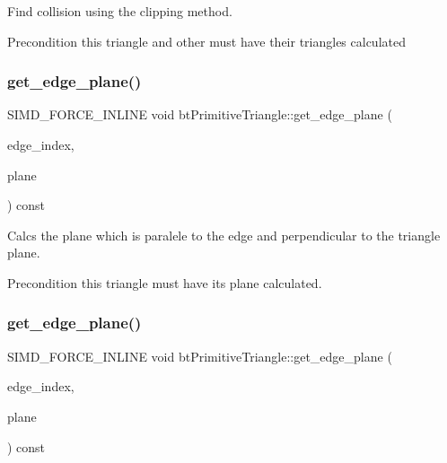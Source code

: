 Find collision using the clipping method. 

\begin{DoxyPrecond}{Precondition}
this triangle and other must have their triangles calculated 
\end{DoxyPrecond}
\mbox{\label{classbtPrimitiveTriangle_a44c4e264a4aa6b92a1188743555f1c92}} 
\subsubsection{\texorpdfstring{get\+\_\+edge\+\_\+plane()}{get\_edge\_plane()}\hspace{0.1cm}{\footnotesize\ttfamily [1/2]}}
{\footnotesize\ttfamily S\+I\+M\+D\+\_\+\+F\+O\+R\+C\+E\+\_\+\+I\+N\+L\+I\+NE void bt\+Primitive\+Triangle\+::get\+\_\+edge\+\_\+plane (\begin{DoxyParamCaption}\item[{int}]{edge\+\_\+index,  }\item[{\hyperlink{classbtVector4}{bt\+Vector4} \&}]{plane }\end{DoxyParamCaption}) const\hspace{0.3cm}{\ttfamily [inline]}}



Calcs the plane which is paralele to the edge and perpendicular to the triangle plane. 

\begin{DoxyPrecond}{Precondition}
this triangle must have its plane calculated. 
\end{DoxyPrecond}
\mbox{\label{classbtPrimitiveTriangle_a44c4e264a4aa6b92a1188743555f1c92}} 
\subsubsection{\texorpdfstring{get\+\_\+edge\+\_\+plane()}{get\_edge\_plane()}\hspace{0.1cm}{\footnotesize\ttfamily [2/2]}}
{\footnotesize\ttfamily S\+I\+M\+D\+\_\+\+F\+O\+R\+C\+E\+\_\+\+I\+N\+L\+I\+NE void bt\+Primitive\+Triangle\+::get\+\_\+edge\+\_\+plane (\begin{DoxyParamCaption}\item[{int}]{edge\+\_\+index,  }\item[{\hyperlink{classbtVector4}{bt\+Vector4} \&}]{plane }\end{DoxyParamCaption}) const\hspace{0.3cm}{\ttfamily [inline]}}



